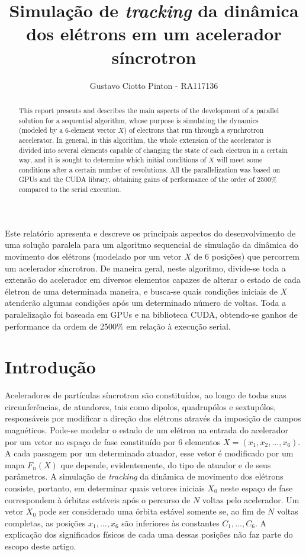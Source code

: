 \documentclass[12pt]{article}
\title{Simulação de \textit{tracking} da dinâmica dos elétrons em um acelerador
síncrotron}
\author{Gustavo Ciotto Pinton\inst{1} - RA117136 }
\begin{document}
 

\maketitle

\begin{abstract}
This report presents and describes the main aspects of the development of a
parallel solution for a sequential algorithm, whose purpose is simulating
the dynamics (modeled by a 6-element vector \(X\)) of electrons that
run through a synchrotron accelerator. In general, in this algorithm, the whole
extension of the accelerator is divided into several elements capable of
changing the state of each electron in a certain way, and it is sought to
determine which initial conditions of \(X\) will meet some conditions after a
certain number of revolutions. All the parallelization was based on GPUs and the
CUDA library, obtaining gains of performance of the order of 2500\% compared
to the serial execution.
\end{abstract}
     
\begin{resumo} 
Este relatório apresenta e descreve os principais aspectos do
desenvolvimento de uma solução paralela para um algoritmo sequencial de
simulação da dinâmica do movimento dos elétrons (modelado por um vetor \(X\) de
6 posições) que percorrem um acelerador síncrotron. De maneira geral, neste
algoritmo, divide-se toda a extensão do acelerador em diversos elementos capazes de alterar o estado de cada életron de
uma determinada maneira, e busca-se quais condições iniciais de \(X\) atenderão
algumas condições após um determinado número de voltas. Toda a paralelização foi
baseada em GPUs e na biblioteca CUDA, obtendo-se ganhos de performance da ordem
de 2500\% em relação à execução serial.
\end{resumo}


\section{Introdução}

Aceleradores de partículas síncrotron são constituídos, ao longo de todas suas
circunferências, de atuadores, tais como dipolos, quadrupólos e sextupólos,
responsáveis por modificar a direção dos elétrons através da imposição de campos
magnéticos. Pode-se modelar o estado de um elétron na entrada do acelerador por
um vetor no espaço de fase constituído por 6 elementos \( X = (x_1, x_2, \ldots,
x_6) \). A cada passagem por um determinado atuador, esse vetor é modificado por
um mapa \(F_n(X)\) que depende, evidentemente, do tipo de atuador e de seus
parâmetros. A simulação de \textit{tracking} da dinâmica de movimento dos
elétrons consiste, portanto, em determinar quais vetores iniciais \(X_0\) neste
espaço de fase correspondem à órbitas estáveis após o percurso de \(N\) voltas
pelo acelerador. Um vetor \(X_0\) pode ser considerado uma
órbita estável somente se, ao fim de \(N\) voltas completas, as posições \(x_1,
\ldots, x_6 \) são inferiores às constantes \(C_1, \ldots, C_6\). A explicação
dos significados físicos de cada uma dessas posições não faz parte do escopo
deste artigo.
\end{document}
